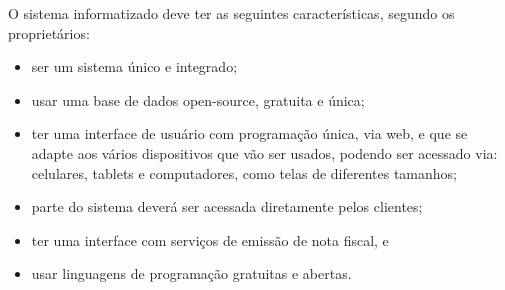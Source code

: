 O sistema informatizado deve ter as seguintes características, segundo os proprietários:
\begin{itemize}
    \item ser um sistema único e integrado;
    \item usar uma base de dados open-source, gratuita e única;
    \item ter uma interface de usuário com programação única, via web, e que se adapte aos vários dispositivos que vão ser usados, podendo ser acessado via: celulares, tablets e computadores, como telas de diferentes tamanhos;
    \item parte do sistema deverá ser acessada diretamente pelos clientes;
    \item ter uma interface com serviços de emissão de nota fiscal, e
    \item usar linguagens de programação gratuitas e abertas.
\end{itemize}


